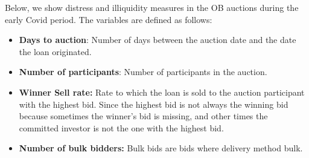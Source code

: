 \documentclass[11pt,a4paper]{article}
\begin{document}
Below, we show distress and illiquidity measures in the OB auctions during the early Covid period. The variables are defined as follows:
\begin{itemize}
\item \textbf{Days to auction}: Number of days between the auction date and the date the loan originated.
\item \textbf{Number of participants}: Number of participants in the auction.
\item  \textbf{Winner Sell rate:} Rate to which the loan is sold to the auction participant with the highest bid. Since the highest bid is not always the winning bid because sometimes the winner's bid is missing, and other times the committed investor is not the one with the highest bid. 
\item \textbf{Number of bulk bidders:} Bulk bids are bids where delivery method bulk.
\end{itemize}
\end{document}
